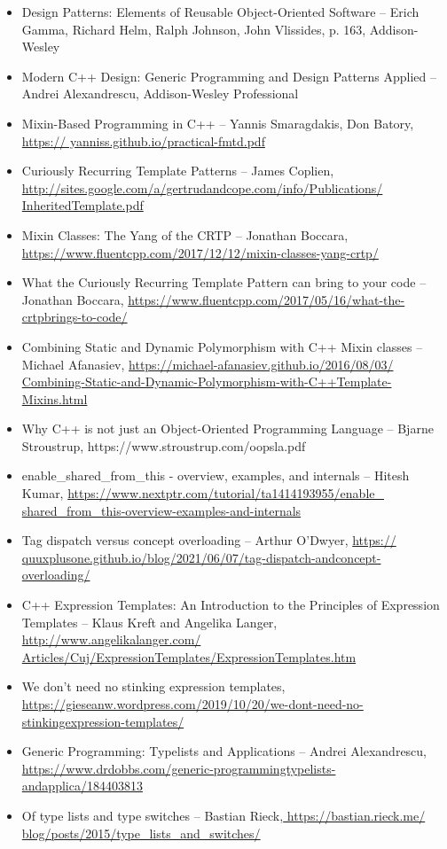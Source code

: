 \begin{itemize}
\item
Design Patterns: Elements of Reusable Object-Oriented Software – Erich Gamma, Richard Helm, Ralph Johnson, John Vlissides, p. 163, Addison-Wesley

\item
Modern C++ Design: Generic Programming and Design Patterns Applied – Andrei Alexandrescu, Addison-Wesley Professional

\item
Mixin-Based Programming in C++ – Yannis Smaragdakis, Don Batory, \url{https:// yanniss.github.io/practical-fmtd.pdf}

\item
Curiously Recurring Template Patterns – James Coplien, \url{http://sites.google.com/a/gertrudandcope.com/info/Publications/ InheritedTemplate.pdf}

\item
Mixin Classes: The Yang of the CRTP – Jonathan Boccara, \url{https://www.fluentcpp.com/2017/12/12/mixin-classes-yang-crtp/}

\item
What the Curiously Recurring Template Pattern can bring to your code – Jonathan Boccara, \url{https://www.fluentcpp.com/2017/05/16/what-the-crtpbrings-to-code/}

\item
Combining Static and Dynamic Polymorphism with C++ Mixin classes – Michael Afanasiev, \url{https://michael-afanasiev.github.io/2016/08/03/ Combining-Static-and-Dynamic-Polymorphism-with-C++Template-Mixins.html}

\item
Why C++ is not just an Object-Oriented Programming Language – Bjarne Stroustrup, https://www.stroustrup.com/oopsla.pdf

\item
enable\_shared\_from\_this - overview, examples, and internals – Hitesh Kumar, \url{https://www.nextptr.com/tutorial/ta1414193955/enable_ shared_from_this-overview-examples-and-internals}

\item
Tag dispatch versus concept overloading – Arthur O’Dwyer, \url{https:// quuxplusone.github.io/blog/2021/06/07/tag-dispatch-andconcept-overloading/}

\item
C++ Expression Templates: An Introduction to the Principles of Expression Templates – Klaus Kreft and Angelika Langer, \url{http://www.angelikalanger.com/ Articles/Cuj/ExpressionTemplates/ExpressionTemplates.htm}

\item
We don’t need no stinking expression templates, \url{https://gieseanw.wordpress.com/2019/10/20/we-dont-need-no-stinkingexpression-templates/}

\item
Generic Programming: Typelists and Applications – Andrei Alexandrescu, \url{https://www.drdobbs.com/generic-programmingtypelists-andapplica/184403813}

\item
Of type lists and type switches – Bastian Rieck,\url{ https://bastian.rieck.me/ blog/posts/2015/type_lists_and_switches/}
\end{itemize}